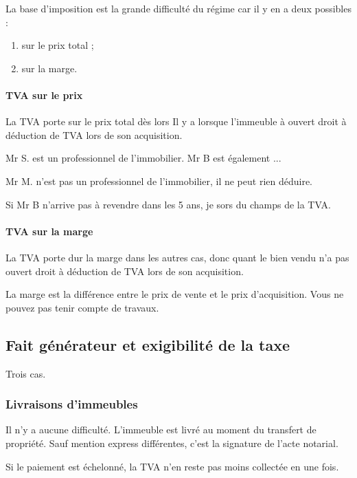 		La base d'imposition est la grande difficulté du régime car il y en a deux possibles :
		\begin{enumerate}
			\item sur le prix total ;
			\item sur la marge.
		\end{enumerate}

		\paragraph{TVA sur le prix}

			La TVA porte sur le prix total dès lors Il y a lorsque l'immeuble à ouvert droit à déduction de TVA lors de son acquisition.

			\begin{exemple}
				Mr S. est un professionnel de l'immobilier. Mr B est également ...

				Mr M. n'est pas un professionnel de l'immobilier, il ne peut rien déduire.

				Si Mr B n'arrive pas à revendre dans les 5 ans, je sors du champs de la TVA.
			\end{exemple}

		\paragraph{TVA sur la marge}

			La TVA porte dur la marge dans les autres cas, donc quant le bien vendu n'a pas ouvert droit à déduction de TVA lors de son acquisition.

			\medskip La marge est la différence entre le prix de vente et le prix d'acquisition.
			Vous ne pouvez pas tenir compte de travaux.

	\subsection{Fait générateur et exigibilité de la taxe}

		Trois cas.

		\subsubsection{Livraisons d’immeubles}

			Il n'y a aucune difficulté. L'immeuble est livré au moment du transfert de propriété. Sauf mention express différentes, c'est la signature de l'acte notarial.

			Si le paiement est échelonné, la TVA n'en reste pas moins collectée en une fois.

